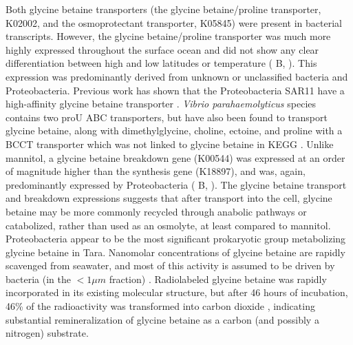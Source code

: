 \documentclass[utf8]{frontiersSCNS} %
\begin{document}
Both glycine betaine transporters (the glycine betaine/proline transporter, K02002, and the osmoprotectant transporter, K05845) were present in bacterial transcripts. However, the glycine betaine/proline transporter was much more highly expressed throughout the surface ocean and did not show any clear differentiation between high and low latitudes or temperature ( B, ). This expression was predominantly derived from unknown or unclassified bacteria and Proteobacteria. Previous work has shown that the Proteobacteria SAR11 have a high-affinity glycine betaine transporter \citep{Noell2019}. \emph{Vibrio parahaemolyticus} species contains two proU ABC transporters, but have also been found to transport glycine betaine, along with dimethylglycine, choline, ectoine, and proline with a BCCT transporter which was not linked to glycine betaine in KEGG \citep{Gregory2020}. Unlike mannitol, a glycine betaine breakdown gene (K00544) was expressed at an order of magnitude higher than the synthesis gene (K18897), and was, again, predominantly expressed by Proteobacteria ( B, ). The glycine betaine transport and breakdown expressions suggests that after transport into the cell, glycine betaine may be more commonly recycled through anabolic pathways or catabolized, rather than used as an osmolyte, at least compared to mannitol. Proteobacteria appear to be the most significant prokaryotic group metabolizing glycine betaine in Tara. Nanomolar concentrations of glycine betaine are rapidly scavenged from seawater, and most of this activity is assumed to be driven by bacteria (in the $<1\mu m$ fraction) \citep{Kiene1998}. Radiolabeled glycine betaine was rapidly incorporated in its existing molecular structure, but after 46 hours of incubation, 46\% of the radioactivity was transformed into carbon dioxide \citep{Kiene1998}, indicating substantial remineralization of glycine betaine as a carbon (and possibly a nitrogen) substrate.
\end{document}
